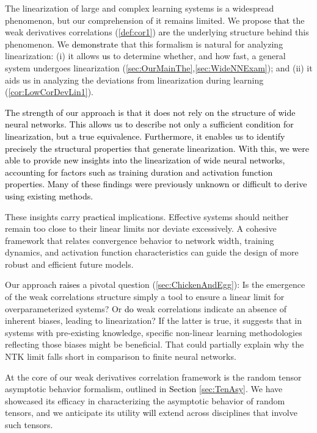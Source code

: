 \documentclass{article} %
\begin{document}
The linearization of large and complex learning systems is a widespread phenomenon, but our comprehension of it remains limited. We propose \textcolor{black}{that} the weak derivatives correlations (\ref{def:cor1}) \textcolor{black}{are} the underlying structure behind this phenomenon. We \textcolor{black}{demonstrate} that this formalism is natural for analyzing linearization: (i) it allows \textcolor{black}{us} to determine whether, and how fast, a general system undergoes linearization (\ref{sec:OurMainThe},\ref{sec:WideNNExam}); and (ii) it aids us in analyzing the deviations from linearization during learning (\ref{cor:LowCorDevLin1}). 

\textcolor{black}{The strength of our approach is that it does not rely on the structure of wide neural networks. This allows us to describe not only a sufficient condition for linearization, but a true equivalence. Furthermore, it enables us to identify precisely the structural properties that generate linearization. With this, we were able to provide new insights into the linearization of wide neural networks, accounting for factors such as training duration and activation function properties. Many of these findings were previously unknown or difficult to derive using existing methods.} 

These insights carry \textcolor{black}{practical} implications. Effective systems should neither remain too close to their linear limits nor deviate excessively. A cohesive framework that relates convergence behavior to network width, training dynamics, and activation function characteristics can guide the design of more robust and efficient future models.

Our approach \textcolor{black}{raises} a pivotal question (\ref{sec:ChickenAndEgg}): Is the emergence of the weak correlations structure simply a tool to ensure a linear limit for overparameterized systems? Or \textcolor{black}{do} weak correlations indicate an absence of inherent biases, leading to linearization? If the latter is true, it suggests that in systems with pre-existing knowledge, specific non-linear learning methodologies reflecting those biases might be beneficial. That could partially explain why the NTK limit falls short in comparison to finite neural networks.

At the core of our weak derivatives correlation framework is the random tensor asymptotic behavior formalism, outlined in \textcolor{black}{Section} \ref{sec:TenAsy}. We have showcased its efficacy in characterizing the asymptotic behavior of random tensors, and we anticipate its utility \textcolor{black}{will} extend across disciplines that involve such tensors.
\end{document}
